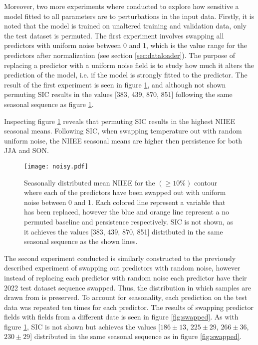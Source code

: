 \documentclass[../main/thesis.tex]{subfiles}
\begin{document}
Moreover, two more experiments where conducted to explore how sensitive a model fitted to all parameters are to perturbations in the input data. Firstly, it is noted that the model is trained on unaltered training and validation data, only the test dataset is permuted. The first experiment involves swapping all predictors with uniform noise between 0 and 1, which is the value range for the predictors after normalization (see section \ref{sec:dataloader}). The purpose of replacing a predictor with a uniform noise field is to study how much it alters the prediction of the model, i.e. if the model is strongly fitted to the predictor. The result of the first experiment is seen in figure \ref{fig:noisy}, and although not shown permuting SIC results in the values [383, 439, 870, 851] following the same seasonal sequence as figure \ref{fig:noisy}.

Inspecting figure \ref{fig:noisy} reveals that permuting SIC results in the highest NIIEE seasonal means. Following SIC, when swapping temperature out with random uniform noise, the NIIEE seasonal means are higher then persistence for both JJA and SON. 

\begin{figure}
    \centering
    \texttt{[image: noisy.pdf]}
    \caption{\label{fig:noisy}Seasonally distributed mean NIIEE for the $(\geq10\%)$ contour where each of the predictors have been swapped out with uniform noise between 0 and 1. Each colored line represent a variable that has been replaced, however the blue and orange line represent a no permuted baseline and persistence respectively. SIC is not shown, as it achieves the values [383, 439, 870, 851] distributed in the same seasonal sequence as the shown lines.}
\end{figure}

The second experiment conducted is similarly constructed to the previously described experiment of swapping out predictors with random noise, however instead of replacing each predictor with random noise each predictor have their 2022 test dataset sequence swapped. Thus, the distribution in which samples are drawn from is preserved. To account for seasonality, each prediction on the test data was repeated ten times for each predictor. The results of swapping predictor fields with fields from a different date is seen in figure \ref{fig:swapped}. As with figure \ref{fig:noisy}, SIC is not shown but achieves the values [$186 \pm 13$, $225 \pm 29$, $266 \pm 36$, $230 \pm 29$] distributed in the same seasonal sequence as in figure \ref{fig:swapped}.
\end{document}

